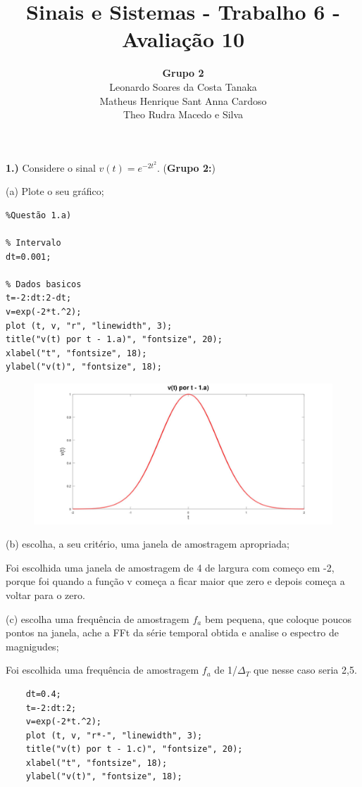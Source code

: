 \documentclass[10pt]{article}
\title{Sinais e Sistemas - Trabalho 6 - Avaliação 10}
\author{
    \textbf{Grupo 2}\\
    Leonardo Soares da Costa Tanaka\\
    Matheus Henrique Sant Anna Cardoso\\
    Theo Rudra Macedo e Silva
}
\date{}
\begin{document}
\maketitle
\thispagestyle{capa}
\newpage

\textbf{1.)} Considere o sinal $v(t) = e^{-2t^2}$. (\textbf{Grupo 2:})

(a) Plote o seu gráfico;

\begin{verbatim}
%Questão 1.a)

% Intervalo
dt=0.001;

% Dados basicos
t=-2:dt:2-dt;
v=exp(-2*t.^2);
plot (t, v, "r", "linewidth", 3);
title("v(t) por t - 1.a)", "fontsize", 20);
xlabel("t", "fontsize", 18);
ylabel("v(t)", "fontsize", 18);
\end{verbatim}

\begin{figure}[h]
    \includegraphics[scale=0.2]{questao1a}
    \centering
\end{figure}

(b) escolha, a seu critério, uma janela de amostragem apropriada;

\vspace{\baselineskip}
Foi escolhida uma janela de amostragem de 4 de largura com começo em -2, porque foi quando a função v começa a ficar maior que zero e depois começa a voltar para o zero.
\vspace{\baselineskip}

(c) escolha uma frequência de amostragem $f_a$ bem pequena, que coloque poucos pontos na janela, ache a FFt da série temporal obtida e analise o espectro de magnigudes;

\vspace{\baselineskip}
Foi escolhida uma frequência de amostragem $f_a$ de 1/$\Delta_T$ que nesse caso seria 2,5.

\begin{verbatim}
    dt=0.4;
    t=-2:dt:2;
    v=exp(-2*t.^2);
    plot (t, v, "r*-", "linewidth", 3);
    title("v(t) por t - 1.c)", "fontsize", 20);
    xlabel("t", "fontsize", 18);
    ylabel("v(t)", "fontsize", 18);
\end{verbatim}
\end{document}

